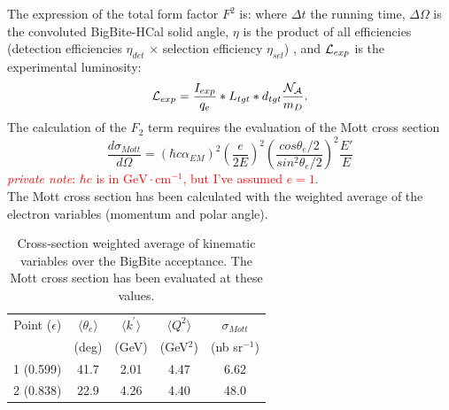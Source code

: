 The expression of the total form factor $F^2$ is: 
where $\Delta t$ the running time, $\Delta\Omega$ is the convoluted BigBite-HCal solid angle, $\eta$ is the product of all efficiencies (detection efficiencies $\eta_{det}$ $\times$ selection efficiency $\eta_{sel}$)
, and ${\cal{L}}_{exp}$ is the experimental luminosity:
%
\begin{equation}
  {\cal{L}}_{exp} = \frac{I_{exp}}{q_e}*L_{tgt}*d_{tgt}\frac{\cal{N}_A}{m_{D}}.
\end{equation}
%
The calculation of the $F_2$ term requires the evaluation of the Mott cross section
%
\begin{equation}
  \frac{d\sigma_{Mott}}{d\Omega} = (\hbar c\alpha_{EM})^2 \left( \frac{e}{2E} \right)^2 \left( \frac{cos{\theta_e/2}}{sin^2{\theta_e/2}} \right)^2 \frac{E'}{E}
\end{equation}
%
\textcolor{red}{{\it private note}: $\hbar c$ is in $\mathrm{GeV}\cdot\mathrm{cm}^{-1}$, but I've assumed $e=1$.}\\
The Mott cross section has been calculated with the weighted average of the electron variables (momentum and polar angle).
%
\begin{center}
\begin{table}[h]
\begin{tabular}{|c|c|c|c|c|}
\hline
Point ($\epsilon$) & $\langle \theta_e \rangle$ &  $\langle k^{\prime} \rangle$ & $\langle Q^2 \rangle$ & $\sigma_{Mott}$ \\
 & (deg) & (GeV) & (GeV$^2$) & (nb sr$^{-1}$) \\
\hline
1 (0.599) & 41.7 & 2.01 & 4.47 & 6.62 \\ 
\hline
2 (0.838) & 22.9 & 4.26 & 4.40 & 48.0 \\
\hline
\end{tabular} 
\caption{Cross-section weighted average of kinematic variables over the BigBite acceptance. The Mott cross section has been evaluated at these values.}
\label{tab:sigma_mott}
\end{table}
\end{center}
%

